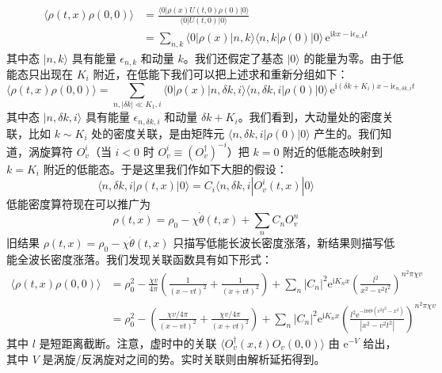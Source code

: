 
\begin{align*}
\langle\rho(t,x)\rho(0,0)\rangle&=\frac{\langle0|\rho(x)U(t,0)\rho(0)|0\rangle}{\langle0|U(t,0)|0\rangle}\\
&=\sum_{n,k}\langle0|\rho(x)|n,k\rangle\langle n,k|\rho(0)|0\rangle\,\mathrm{e}^{\mathrm{i}kx-\mathrm{i}\epsilon_{n,k}t}
\end{align*}
其中态 $|n,k\rangle$ 具有能量 $\epsilon_{n,k}$ 和动量 $k$。我们还假定了基态 $|0\rangle$ 的能量为零。由于低能态只出现在 $K_i$ 附近，在低能下我们可以把上述求和重新分组如下：
\begin{equation*}
\langle\rho(t,x)\rho(0,0)\rangle=\sum_{n,|\delta k|\ll K_1,i}\langle0|\rho(x)|n,\delta k,i\rangle\langle n,\delta k,i|\rho(0)|0\rangle\,\mathrm{e}^{\mathrm{i}(\delta k+K_i)x-\mathrm{i}\epsilon_{n,\delta k,i}t}
\end{equation*}
其中态 $|n,\delta k,i\rangle$ 具有能量 $\epsilon_{n,\delta k,i}$ 和动量 $\delta k+K_i$。我们看到，大动量处的密度关联，比如 $k\sim K_i$ 处的密度关联，是由矩阵元 $\langle n,\delta k,i|\rho(0)|0\rangle$ 产生的。我们知道，涡旋算符 $O_v^i$（当 $i<0$ 时 $O_v^i\equiv(O_v^\dagger)^{-i}$）把 $k=0$ 附近的低能态映射到 $k=K_i$ 附近的低能态。于是这里我们作如下大胆的假设：
\begin{equation*}
\langle n,\delta k,i|\rho(t,x)|0\rangle=C_i\langle n,\delta k,i|O_v^i(t,x)|0\rangle
\end{equation*}
低能密度算符现在可以推广为
\begin{equation*}
\rho(t,x)=\rho_0-\chi\dot{\theta}(t,x)+\sum_n C_nO_v^n
\end{equation*}
旧结果 $\rho(t,x)=\rho_0-\chi\dot{\theta}(t,x)$ 只描写低能长波长密度涨落，新结果则描写低能全波长密度涨落。我们发现关联函数具有如下形式：
\begin{align*}
\langle\rho(t,x)\rho(0,0)\rangle
&=\rho_0^2-\frac{\chi v}{4\pi}\left(\frac{1}{(x-vt)^2}+\frac{1}{(x+vt)^2}\right)+\sum_n|C_n|^2\mathrm{e}^{\mathrm{i}K_nx}\left(\frac{l^2}{x^2-v^2t^2}\right)^{n^2\pi\chi v}\\
&=\rho_0^2-\left(\frac{\chi v/4\pi}{(x-vt)^2}+\frac{\chi v/4\pi}{(x+vt)^2}\right)+\sum_n|C_n|^2\mathrm{e}^{\mathrm{i}K_nx}\left(\frac{l^2\mathrm{e}^{-\mathrm{i}\pi\Theta(v^2t^2-x^2)}}{|x^2-v^2t^2|}\right)^{n^2\pi\chi v}\tag{3.6.2}
\end{align*}
其中 $l$ 是短距离截断。注意，虚时中的关联 $\langle O_v^\dagger(x,t)O_v(0,0)\rangle$ 由 $\mathrm{e}^{-V}$ 给出，其中 $V$ 是涡旋/反涡旋对之间的势。实时关联则由解析延拓得到。

